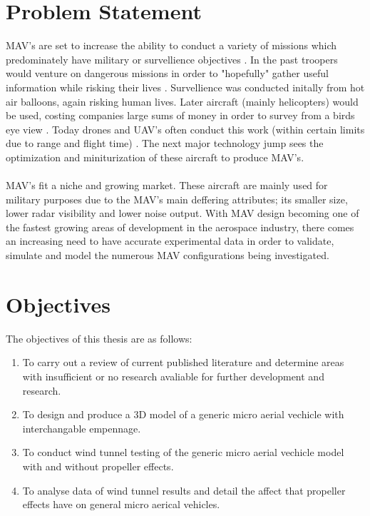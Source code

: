 \section{Problem Statement}
\label{ProblemStatement}
MAV's are set to increase the ability to conduct a variety of missions which predominately have military or survellience objectives \cite{Aleksander2018} \cite{Mil2022} \cite{Greenwood2019} \cite{Saytov2022}. In the past troopers would venture on dangerous missions in order to "hopefully" gather useful information while risking their lives \cite{NONAMI2007}. Survellience was conducted initally from hot air balloons, again risking human lives. Later aircraft (mainly helicopters) would be used, costing companies large sums of money in order to survey from a birds eye view \cite{Aleksander2018}. Today drones and UAV's often conduct this work (within certain limits due to range and flight time) \cite{NONAMI2007} \cite{Aleksander2018}. The next major technology jump sees the optimization and miniturization of these aircraft to produce MAV's. \\
\\
MAV's fit a niche and growing market. These aircraft are mainly used for military purposes due to the MAV's main deffering attributes; its smaller size, lower radar visibility and lower noise output. With MAV design becoming one of the fastest growing areas of development in the aerospace industry, there comes an increasing need to have accurate experimental data in order to validate, simulate and model the numerous MAV configurations being investigated. 



\section{Objectives}
\label{sec:Objectives}
The objectives of this thesis are as follows:

\begin{enumerate}
  \item To carry out a review of current published literature and determine areas with insufficient or no research avaliable for further development and research.
  \item To design and produce a 3D model of a generic micro aerial vechicle with interchangable empennage.
  \item To conduct wind tunnel testing of the generic micro aerial vechicle model with and without propeller effects.
  \item To analyse data of wind tunnel results and detail the affect that propeller effects have on general micro aerical vehicles.
\end{enumerate}


